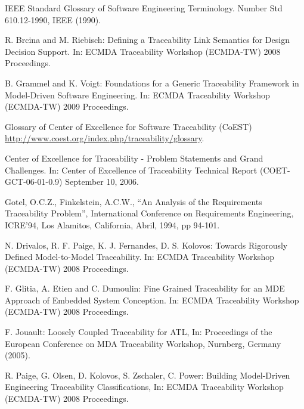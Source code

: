 \documentclass[a4paper,12pt,oneside,spanish]{book}
\begin{document}

\printglossaries





\begin{thebibliography}{99}


 IEEE Standard Glossary of Software Engineering Terminology. Number Std 610.12-1990, IEEE (1990).

 R. Brcina and M. Riebisch: Defining a Traceability Link Semantics for Design Decision Support. In: ECMDA Traceability Workshop (ECMDA-TW) 2008 Proceedings.

 B. Grammel and K. Voigt: Foundations for a Generic Traceability Framework in Model-Driven Software Engineering. In: ECMDA Traceability Workshop (ECMDA-TW) 2009 Proceedings.

 Glossary of Center of Excellence for Software Traceability (CoEST) \url{http://www.coest.org/index.php/traceability/glossary}.

 Center of Excellence for Traceability - Problem Statements and Grand Challenges. In: Center of Excellence of Traceability Technical Report (COET-GCT-06-01-0.9) September 10, 2006.

 Gotel, O.C.Z., Finkelstein, A.C.W., “An Analysis of the Requirements Traceability Problem”, International Conference on Requirements Engineering, ICRE’94, Los Alamitos, California, Abril, 1994, pp 94-101.

 N. Drivalos, R. F. Paige, K. J. Fernandes, D. S. Kolovos: Towards Rigorously Defined Model-to-Model Traceability. In: ECMDA Traceability Workshop (ECMDA-TW) 2008 Proceedings.

 F. Glitia, A. Etien and C. Dumoulin: Fine Grained Traceability for an MDE Approach of Embedded System Conception. In: ECMDA Traceability Workshop (ECMDA-TW) 2008 Proceedings.

 F. Jouault: Loosely Coupled Traceability for ATL, In: Proceedings of the European Conference on MDA Traceability Workshop, Nurnberg, Germany (2005).

 R. Paige, G. Olsen, D. Kolovos, S. Zschaler, C. Power: Building Model-Driven Engineering Traceability Classifications, In: ECMDA Traceability Workshop (ECMDA-TW) 2008 Proceedings.


\end{thebibliography}
\end{document}

